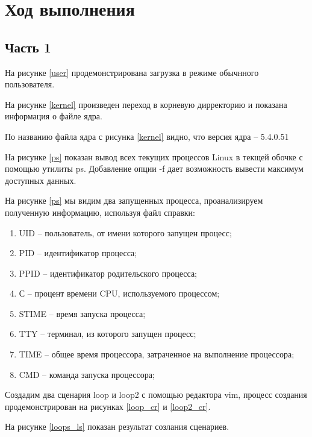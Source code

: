 \section{Ход выполнения}
\subsection{Часть 1}

На рисунке \ref{user} продемонстрирована загрузка в режиме обычнного пользователя.

На рисунке \ref{kernel} произведен переход в корневую дирректорию и показана информация о файле ядра.

По названию файла ядра с рисунка \ref{kernel} видно, что версия ядра -- 5.4.0.51

На рисунке \ref{ps} показан вывод всех текущих процессов Linux в текщей обочке с помощью утилиты ps. Добавление опции -f дает возможность вывести максимум доступных данных.

На рисунке \ref{ps} мы видим два запущенных процесса, проанализируем полученную информацию, используя файл справки:

\begin{enumerate}
    \item UID -- пользователь, от имени которого запущен процесс;
    \item PID -- идентификатор процесса;
    \item PPID -- идентификатор родительского процесса;
    \item С -- процент времени CPU, используемого процессом;
    \item STIME -- время запуска процесса;
    \item TTY -- терминал, из которого запущен процесс;
    \item TIME -- общее время процессора, затраченное на выполнение процессора;
    \item CMD -- команда запуска процессора;
\end{enumerate}

Создадим два сценария loop и loop2 с помощью редактора vim, процесс создания продемонстрирован на рисунках \ref{loop_cr} и \ref{loop2_cr}.


На рисунке \ref{loops_ls} показан результат созлания сценариев.

